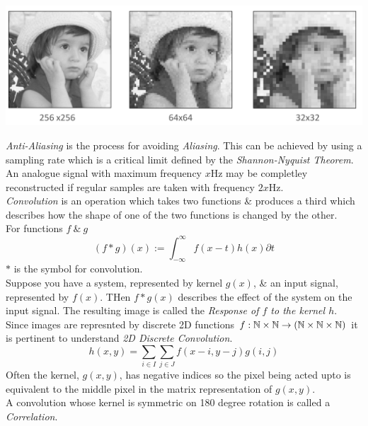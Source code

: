 \documentclass[11pt,a4paper]{article}
\begin{document}
\includegraphics[scale=.4]{img/aliasing.png}

\textit{Anti-Aliasing} is the process for avoiding \textit{Aliasing}. This can be achieved by using a sampling rate which is a critical limit defined by the \textit{Shannon-Nyquist Theorem}.\\

An analogue signal with maximum frequency $x\text{Hz}$ may be completley reconstructed if regular samples are taken with frequency $2x\text{Hz}$.\\

\textit{Convolution} is an operation which takes two functions \& produces a third which describes how the shape of one of the two functions is changed by the other.\\
For functions $f\ \&\ g$
$$(f*g)(x):=\int_{-\infty}^\infty f(x-t)h(x)\partial t$$
\nb $*$ is the symbol for convolution.\\

Suppose you have a system, represented by kernel $g(x)$, \& an input signal, represented by $f(x)$. THen $f*g(x)$ describes the effect of the system on the input signal. The resulting image is called the \textit{Response of $f$ to the kernel $h$}.\\

Since images are represnted by discrete 2D functions $f:\mathbb{N}\times\mathbb{N}\to(\mathbb{N}\times\mathbb{N}\times\mathbb{N})$ it is pertinent to understand \textit{2D Discrete Convolution}.\\
$$h(x,y)=\sum_{i\in I}\sum_{j\in J}f(x-i,y-j)g(i,j)$$
Often the kernel, $g(x,y)$, has negative indices so the pixel being acted upto is equivalent to the middle pixel in the matrix representation of $g(x,y)$.\\
\nb A convolution whose kernel is symmetric on 180 degree rotation is called a \textit{Correlation}.\\
\end{document}
